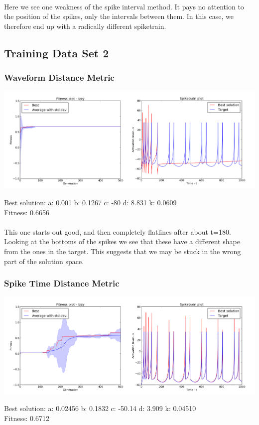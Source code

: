 \documentclass[a4paper,12pt]{article}
\begin{document}
\paragraph{}Here we see one weakness of the spike interval method. It pays no attention to the position of the spikes, only the intervals between them. In this case, we therefore end up with a radically different spiketrain.

\subsection{Training Data Set 2}
\subsubsection{Waveform Distance Metric}
\centerline{\includegraphics[width=1.0\textwidth]{img/case2_wave}}
Best solution: 
a: 0.001 
b: 0.1267 
c: -80 
d: 8.831 
k: 0.0609 \\
Fitness: 0.6656
\paragraph{}This one starts out good, and then completely flatlines after about t=180. Looking at the bottoms of the spikes we see that these have a different shape from the ones in the target. This suggests that we may be stuck in the wrong part of the solution space.

\subsubsection{Spike Time Distance Metric}
\centerline{\includegraphics[width=1.0\textwidth]{img/case2_time}}
Best solution: 
a: 0.02456 
b: 0.1832 
c: -50.14 
d: 3.909 
k: 0.04510 \\
Fitness: 0.6712
\end{document}
